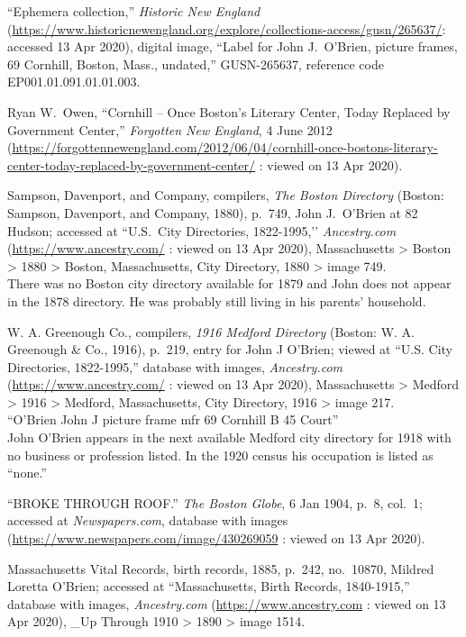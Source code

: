 \begin{thebibliography}{999}
	``Ephemera collection,'' \textit{Historic New England} (\url{https://www.historicnewengland.org/explore/collections-access/gusn/265637/}: accessed 13 Apr 2020), digital image, ``Label for John J.\ O'Brien, picture frames, 69 Cornhill, Boston, Mass., undated,'' GUSN-265637, reference code EP001.01.091.01.01.003.
	
	Ryan W.\ Owen, ``Cornhill -- Once Boston’s Literary Center, Today Replaced by Government Center,'' \textit{Forgotten New England}, 4 June 2012 (\url{https://forgottennewengland.com/2012/06/04/cornhill-once-bostons-literary-center-today-replaced-by-government-center/} : viewed on 13 Apr 2020).
	
	Sampson, Davenport, and Company, compilers, \textit{The Boston Directory} (Boston: Sampson, Davenport, and Company, 1880), p.\ 749, John J.\ O'Brien at 82 Hudson; accessed at ``U.S.\ City Directories, 1822-1995,’’ \textit{Ancestry.com} (\url{https://www.ancestry.com/} : viewed on 13 Apr 2020), Massachusetts > Boston > 1880 > Boston, Massachusetts, City Directory, 1880 > image 749.\\
	There was no Boston city directory available for 1879 and John does not appear in the 1878 directory. He was probably still living in his parents' household.
	
	W. A. Greenough Co., compilers, \textit{1916 Medford Directory} (Boston: W. A. Greenough \& Co., 1916), p.\ 219, entry for John J O'Brien; viewed at ``U.S. City Directories, 1822-1995,'' database with images, \textit{Ancestry.com} (\url{https://www.ancestry.com/} : viewed on 13 Apr 2020), Massachusetts > Medford > 1916 > Medford, Massachusetts, City Directory, 1916 > image 217.\\
	``O'Brien John J picture frame mfr 69 Cornhill B 45 Court''\\
	John O'Brien appears in the next available Medford city directory for 1918 with no business or profession listed. In the 1920 census his occupation is listed as ``none.''
	
	``BROKE THROUGH ROOF.'' \textit{The Boston Globe}, 6 Jan 1904, p.\ 8, col.\ 1; accessed at \textit{Newspapers.com}, database with images (\url{https://www.newspapers.com/image/430269059} : viewed on 13 Apr 2020).
	
	Massachusetts Vital Records, birth records, 1885, p.\ 242, no.\ 10870, Mildred Loretta O'Brien; accessed at ``Massachusetts, Birth Records, 1840-1915,'' database with images, \textit{Ancestry.com} (\url{https://www.ancestry.com} : viewed on 13 Apr 2020), \_Up Through 1910 > 1890 > image 1514.
	

\end{thebibliography}
